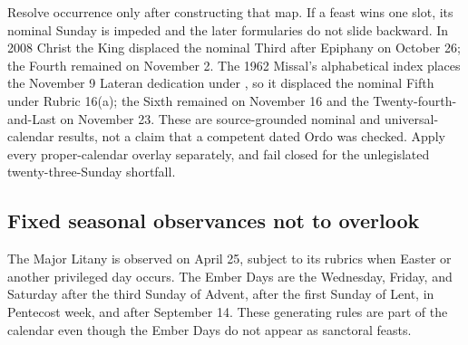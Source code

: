 Resolve occurrence only after constructing that map. If a feast wins one slot, its nominal Sunday is impeded and the later formularies do not slide backward. In 2008 Christ the King displaced the nominal Third after Epiphany on October 26; the Fourth remained on November 2. The 1962 Missal's alphabetical index places the November 9 Lateran dedication under , so it displaced the nominal Fifth under Rubric 16(a); the Sixth remained on November 16 and the Twenty-fourth-and-Last on November 23. These are source-grounded nominal and universal-calendar results, not a claim that a competent dated Ordo was checked. Apply every proper-calendar overlay separately, and fail closed for the unlegislated twenty-three-Sunday shortfall.

\subsection{Fixed seasonal observances not to overlook}

The Major Litany is observed on April 25, subject to its rubrics when Easter or another privileged day occurs. The Ember Days are the Wednesday, Friday, and Saturday after the third Sunday of Advent, after the first Sunday of Lent, in Pentecost week, and after September 14. These generating rules are part of the calendar even though the Ember Days do not appear as sanctoral feasts.

